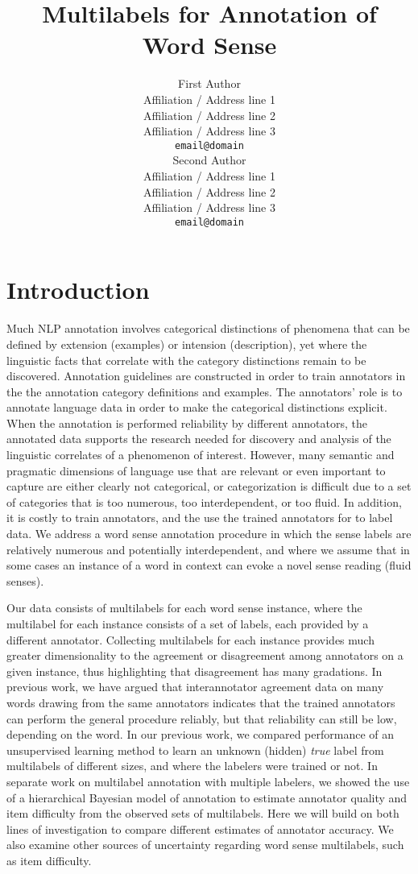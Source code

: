 \documentclass[11pt]{article}
\title{Multilabels for Annotation of Word Sense}
\author{First Author \\
   Affiliation / Address line 1 \\
   Affiliation / Address line 2 \\
   Affiliation / Address line 3 \\
  {\tt email@domain} \\\And
   Second Author \\
   Affiliation / Address line 1 \\
   Affiliation / Address line 2 \\
   Affiliation / Address line 3 \\
   {\tt email@domain} 
\\}
\date{}
\begin{document}
\maketitle
\begin{abstract}

\end{abstract}

\section{Introduction} %


Much NLP annotation involves categorical distinctions of phenomena
that can be defined by extension (examples) or intension
(description), yet where the linguistic facts that correlate with the
category distinctions remain to be discovered. Annotation guidelines
are constructed in order to train annotators in the the annotation
category definitions and examples. The annotators’ role is to annotate
language data in order to make the categorical distinctions
explicit. When the annotation is performed reliability by different
annotators, the annotated data supports the research needed for
discovery and analysis of the linguistic correlates of a phenomenon
of interest. However, many semantic and pragmatic dimensions of
language use that are relevant or even important to capture are either
clearly not categorical, or categorization is difficult due to a set
of categories that is too numerous, too interdependent, or too
fluid. In addition, it is costly to train annotators, and the use the
trained annotators for to label data. We address a word sense
annotation procedure in which the sense labels are relatively numerous
and potentially interdependent, and where we assume that in some cases
an instance of a word in context can evoke a novel sense reading
(fluid senses).

Our data consists of multilabels for each word sense instance, where
the multilabel for each instance consists of a set of labels, each
provided by a different annotator. Collecting multilabels for each
instance provides much greater dimensionality to the agreement or
disagreement among annotators on a given instance, thus highlighting
that disagreement has many gradations. In previous work, we have
argued that interannotator agreement data on many words drawing from
the same annotators indicates that the trained annotators can perform
the general procedure reliably, but that reliability can still be low,
depending on the word. In our previous work, we compared performance
of an unsupervised learning method to learn an unknown (hidden) {\it
true} label from multilabels of different sizes, and where the
labelers were trained or not. In separate work on multilabel
annotation with multiple labelers, we showed the use of a hierarchical
Bayesian model of annotation to estimate annotator quality and item
difficulty from the observed sets of multilabels. Here we will build
on both lines of investigation to compare different estimates of
annotator accuracy. We also examine other sources of uncertainty
regarding word sense multilabels, such as item difficulty.
\end{document}
